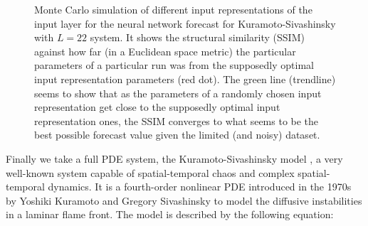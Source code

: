 \documentclass[journal]{IEEEtran}
\begin{document}
\begin{figure}[!htb]
\centering
{}
\caption{Monte Carlo simulation of different  input representations of the input layer for the neural network forecast for
Kuramoto-Sivashinsky with $L=22$ system.
It shows the structural similarity (SSIM) against how far (in a Euclidean space metric) the particular parameters of a particular
run was from the supposedly optimal input representation parameters (red dot). The green line (trendline) seems to show that as the parameters
of a randomly chosen input representation get close to the supposedly optimal input representation ones, the SSIM converges to what seems to be the
best possible forecast value given the limited (and noisy) dataset.}
\label{MonteCarloSSIMversusParameterMetricDistanceKS_L=22}
\end{figure}


Finally we take a full PDE system, the Kuramoto-Sivashinsky model \cite{1976PThPh..55..356K,1977AcAau...4.1177S},
a very well-known system capable of spatial-temporal chaos
and complex spatial-temporal dynamics. It is a fourth-order nonlinear PDE introduced in the 1970s by Yoshiki
Kuramoto and Gregory Sivashinsky to model the diffusive instabilities
in a laminar flame front.
The model is described by the following equation:
\end{document}
